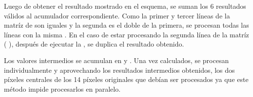 Luego de obtener el resultado mostrado en el esquema, se suman los 6 resultados válidos al acumulador correspondiente. 
Como la primer y tercer líneas de la matríz de  son iguales y la segunda es el doble de la primera, se procesan todas las líneas 
con la misma . En el caso de estar procesando la segunda línea de la matríz (
), después de ejecutar la  , se duplica el resultado obtenido.

	Los valores intermedios se acumulan en  y . Una vez calculados, se procesan individualmente y aprovechando los resultados
intermedios obtenidos, los dos píxeles centrales de los 14 píxeles originales que debían ser procesados ya que este método impide procesarlos en paralelo.

